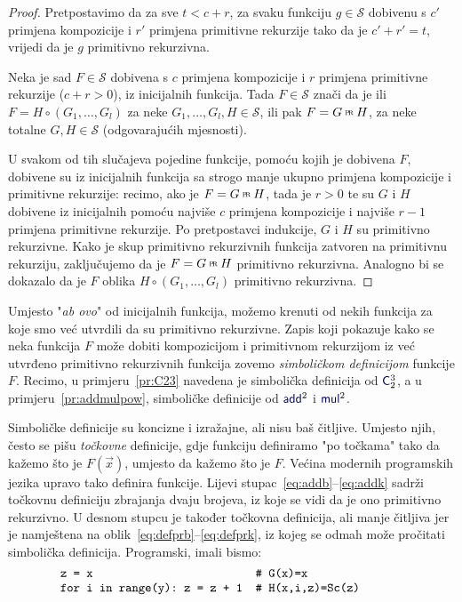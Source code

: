 \begin{proof}
Pretpostavimo da za sve $t<c+r$, za svaku funkciju $g\in\mathcal S$ dobivenu s $c'$ primjena kompozicije i $r'$ primjena primitivne rekurzije tako da je $c'+r'=t$, vrijedi da je $g$ primitivno rekurzivna.

    Neka je sad $F\in\mathcal S$ dobivena s $c$ primjena kompozicije i $r$ primjena primitivne rekurzije ($c+r>0$), iz inicijalnih funkcija. Tada $F\in\mathcal S$ znači da je ili $F=H\circ(G_1,\dotsc,G_l)$ za neke $G_1,\dotsc,G_l,H\in\mathcal S$, ili pak $F=G\pr H$, za neke totalne $G,H\in\mathcal S$ (odgovarajućih mjesnosti).

	U svakom od tih slučajeva pojedine funkcije, pomoću kojih je dobivena $F$, dobivene su iz inicijalnih funkcija sa strogo manje ukupno primjena kompozicije i primitivne rekurzije: recimo, ako je $F=G\pr H$, tada je $r>0$ te su $G$ i $H$ dobivene iz inicijalnih pomoću najviše $c$ primjena kompozicije i najviše $r-1$ primjena primitivne rekurzije. Po pretpostavci indukcije, $G$ i $H$ su primitivno rekurzivne. Kako je skup primitivno rekurzivnih funkcija zatvoren na primitivnu rekurziju, zaključujemo da je $F=G\pr H$ primitivno rekurzivna. Analogno bi se dokazalo da je $F$ oblika $H\circ(G_1,\dotsc,G_l)$ primitivno rekurzivna.
\end{proof}

\begin{napomena}[{name=[ulančavanje simboličkih definicija]}]\label{nap:symbdef}
Umjesto "\emph{ab ovo}" od inicijalnih funkcija, možemo krenuti od nekih funkcija za koje smo već utvrdili da su primitivno rekurzivne. Zapis koji pokazuje kako se neka funkcija $F$ može dobiti kompozicijom i primitivnom rekurzijom iz već utvrđeno primitivno rekurzivnih funkcija zovemo \emph{simboličkom definicijom} funkcije $F$. Recimo, u primjeru~\ref{pr:C23} navedena je simbolička definicija od $\f C_2^3$, a u primjeru~\ref{pr:addmulpow}, simboličke definicije od $\f{add}^2$ i $\f{mul}^2$.
\end{napomena}

Simboličke definicije su koncizne i izražajne, ali nisu baš čitljive. Umjesto njih, često se pišu \emph{točkovne} definicije, gdje funkciju definiramo "po točkama" tako da kažemo što je $F(\vec x)$, umjesto da kažemo što je $F$. Većina modernih programskih jezika upravo tako definira funkcije. Lijevi stupac~\eqref{eq:addb}--\eqref{eq:addk} sadrži točkovnu definiciju zbrajanja dvaju brojeva, iz koje se vidi da je ono primitivno rekurzivno. U desnom stupcu je također točkovna definicija, ali manje čitljiva jer je namještena na oblik~\eqref{eq:defprb}--\eqref{eq:defprk}, iz kojeg se odmah može pročitati simbolička definicija. Programski, imali bismo:
\begin{equation}
	\begin{minipage}{0.8\textwidth}
		\begin{verbatim}
z = x                         # G(x)=x
for i in range(y): z = z + 1  # H(x,i,z)=Sc(z)
		\end{verbatim}
	\end{minipage}
\end{equation}

